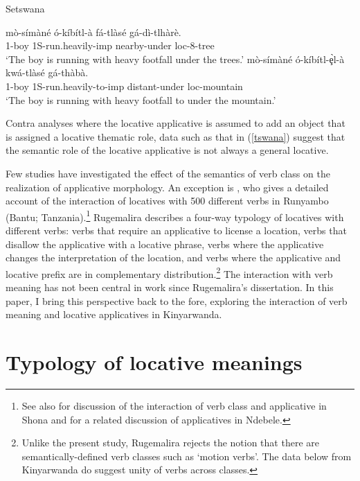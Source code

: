 \documentclass[output=paper]{langsci/langscibook}
\begin{document}
\begin{exe}
	\ex\label{tswana}Setswana\begin{xlist}
		\ex  \gll m\`o-s\'im\`an\'e \'o-k\'ib\'itl-\`a f\'a-tl\`as\'e g\'a-d\`i-tlh\`ar\`e.\\
			1-boy 1S-run.heavily-{\sc imp} {\sc nearby-}under {\sc loc-8-}tree\\
			\glt `The boy is running with heavy footfall under the trees.'
		\ex\gll m\`o-s\'im\`an\'e \'o-k\'ib\'itl-\c{\`e}l-\`a kw\'a-tl\`as\'e g\'a-th\`ab\`a.\\
			1-boy 1S-run.heavily-to-{\sc imp} {\sc distant}-under {\sc loc-}mountain\\
			\glt `The boy is running with heavy footfall to under the mountain.'  \citep[Tables VI-VII]{Schaefer1985}
	\end{xlist}
\end{exe}
%
Contra analyses where the locative applicative is assumed to add an object that is assigned a {\sc locative} thematic role, data such as that in (\ref{tswana}) suggest that the semantic role of the locative applicative is not always a general {\sc locative}.

Few studies have investigated the effect of the semantics of verb class on the realization of applicative morphology. An exception is \citet{rugemalira:1993}, who gives a detailed account of the interaction of locatives with 500 different verbs in Runyambo (Bantu; Tanzania).\footnote{See also \citet{cannmabugu:2006} for discussion of the interaction of verb class and applicative in Shona and \citet{sibanda:2016} for a related discussion of applicatives in Ndebele.} Rugemalira describes a four-way typology of locatives with different verbs: verbs that require an applicative to license a location, verbs that disallow the applicative with a locative phrase, verbs where the applicative changes the interpretation of the location, and verbs where the applicative and locative prefix are in complementary distribution.\footnote{Unlike the present study, Rugemalira rejects the notion that there are semantically-defined verb classes such as `motion verbs'. The data below from Kinyarwanda do suggest unity of verbs across classes.}
The interaction with verb meaning has not been central in work since Rugemalira's dissertation. In this paper, I bring this perspective back to the fore, exploring the interaction of verb meaning and locative applicatives in Kinyarwanda.

\section{Typology of locative meanings}%
\end{document}

